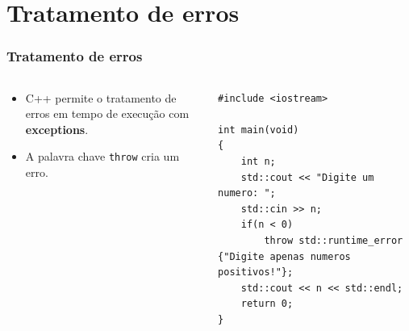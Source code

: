 \documentclass[xcolor={usenames,dvipsnames},10pt,presentation,aspectratio=169]{beamer}
\begin{document}
\section{Tratamento de erros}
\begin{frame}[fragile]
  \frametitle{Tratamento de erros}
  \vspace{-2mm}
    \begin{columns}
      \begin{column}{0.4\textwidth}
          \begin{itemize}
            \item C++ permite o tratamento de erros em tempo de execução com \textbf{exceptions}.
            \item A palavra chave \texttt{throw} cria um erro.
          \end{itemize}
     \end{column}
      \begin{column}{0.6\textwidth}
  \begin{block}{}
\begin{lstlisting}
#include <iostream>

int main(void)
{
    int n;
    std::cout << "Digite um numero: ";
    std::cin >> n;
    if(n < 0)
        throw std::runtime_error {"Digite apenas numeros positivos!"};
    std::cout << n << std::endl;
    return 0;
}
\end{lstlisting}
\end{block}
      \end{column}
    \end{columns}
%
\end{frame}
\end{document}
